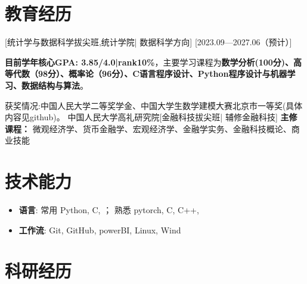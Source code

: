 \documentclass{resume}
\begin{document}


\ResumeTitle


\section{教育经历}
[\textnormal{统计学与数据科学拔尖班,统计学院|} 数据科学方向]
[2023.09—2027.06（预计）]

\textbf{目前学年核心GPA: 3.85/4.0|rank10\%}，主要学习课程为\textbf{数学分析(100分)、高等代数（98分）、概率论（96分）、C语言程序设计、Python程序设计与机器学习、数据结构与算法}。

获奖情况:中国人民大学二等奖学金、中国大学生数学建模大赛北京市一等奖(具体内容见github)。
\ResumeItem
{中国人民大学高礼研究院}[\textnormal{金融科技拔尖班|} 辅修金融科技]
\textbf{主修课程：} 微观经济学、货币金融学、宏观经济学、金融学实务、金融科技概论、商业技能

\section[技术能力]{技术能力\protect}
\begin{itemize}
  \item \textbf{语言}: 常用 Python, C, ； 熟悉 pytorch, C, C++, 
  \item \textbf{工作流}: Git, GitHub, powerBI, Linux, Wind
\end{itemize}

\section{科研经历}
\end{document}
